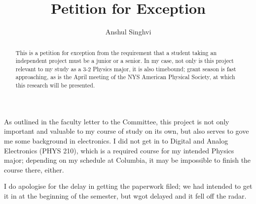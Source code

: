\documentclass[12pt]{article}
\title{Petition for Exception}
\author{Anshul Singhvi}
\begin{document}
\maketitle

\begin{abstract}
  This is a petition for exception from the requirement that a student taking an independent project must be a junior or a senior.  In my case, not only is this project relevant to my study as a 3-2 Physics major, it is also timebound; grant season is fast approaching, as is the April meeting of the NYS American Physical Society, at which this research will be presented.
\end{abstract}

As outlined in the faculty letter to the Committee, this project is not only important and valuable to my course of study on its own, but also serves to gove me some background in electronics.  I did not get in to Digital and Analog Electronics (PHYS 210), which is a required course for my intended Physics major; depending on my schedule at Columbia, it may be impossible to finish the course there, either.

I do apologise for the delay in getting the paperwork filed; we had intended to get it in at the beginning of the semester, but wgot delayed and it fell off the radar.

\end{document}

